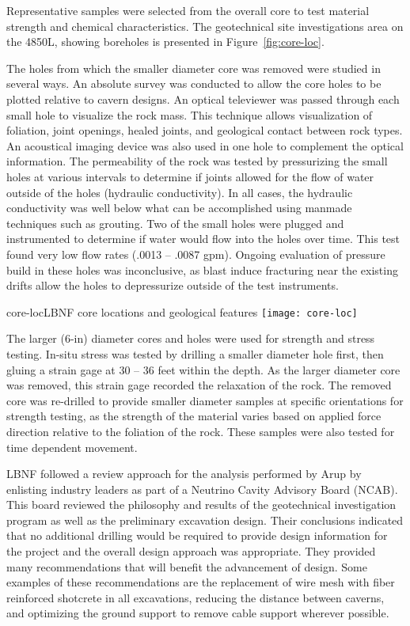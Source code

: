 Representative samples were selected from the overall core to test material strength and chemical characteristics. The geotechnical site investigations area on the 4850L, showing boreholes is presented in Figure~\ref{fig:core-loc}. 

The holes from which the smaller diameter core was removed were studied in several ways.  An absolute survey was conducted to allow the core holes to be plotted relative to cavern designs.  An optical televiewer was passed through each small hole to visualize the rock mass.  This technique allows visualization of foliation, joint openings, healed joints, and geological contact between rock types.  An acoustical imaging device was also used in one hole to complement the optical information.  The permeability of the rock was tested by pressurizing the small holes at various intervals to determine if joints allowed for the flow of water outside of the holes (hydraulic conductivity).  In all cases, the hydraulic conductivity was well below what can be accomplished using manmade techniques such as grouting.   Two of the small holes were plugged and instrumented to determine if water would flow into the holes over time.  This test found very low flow rates (.0013 -- .0087 gpm).  Ongoing evaluation of pressure build in these holes was inconclusive, as blast induce fracturing near the existing drifts allow the holes to depressurize outside of the test instruments.

\begin{cdrfigure}{core-loc}{LBNF core locations and geological features}
\texttt{[image: core-loc]}
\end{cdrfigure}

The larger (6-in) diameter cores and holes were used for strength and stress testing.  In-situ stress was tested by drilling a smaller diameter hole first, then gluing a strain gage at 30 -- 36 feet within the depth.  As the larger diameter core was removed, this strain gage recorded the relaxation of the rock.  The removed core was re-drilled to provide smaller diameter samples at specific orientations for strength testing, as the strength of the material varies based on applied force direction relative to the foliation of the rock.  These samples were also tested for time dependent movement. 

LBNF followed a review approach for the analysis performed by Arup by enlisting industry leaders as part of a Neutrino Cavity Advisory Board (NCAB).  This board reviewed the philosophy and results of the geotechnical investigation program as well as the preliminary excavation design.  Their conclusions indicated that no additional drilling would be required to provide design information for the project and the overall design approach was appropriate.  They provided many recommendations that will benefit the advancement of design.  Some examples of these recommendations are the replacement of wire mesh with fiber reinforced shotcrete in all excavations, reducing the distance between caverns, and optimizing the ground support to remove cable support wherever possible. 


